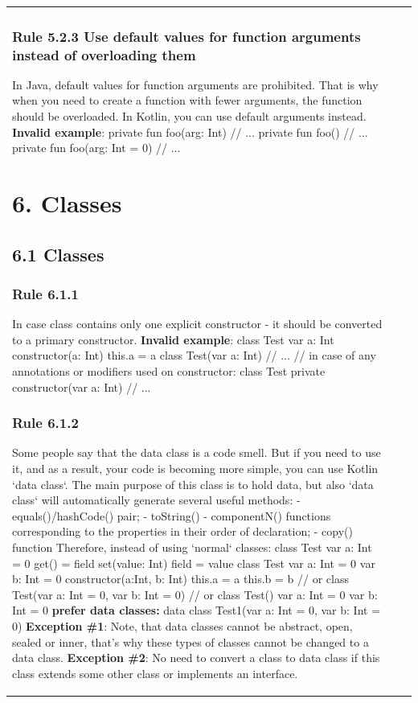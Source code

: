 \begin{center}
\begin{tabular}{ |p{}|p{}|p{}| }
{{{{{\subsubsection*{\textbf{Rule 5.2.3 Use default values for function arguments instead of overloading them}}
In Java, default values for function arguments are prohibited. That is why when you need to create a function with fewer arguments, the function should be overloaded.
In Kotlin, you can use default arguments instead.
\textbf{Invalid example}:
private fun foo(arg: Int) {
    // ...
}
private fun foo() {
    // ...
}
 private fun foo(arg: Int = 0) {
     // ...
 }
\section*{\textbf{6. Classes}}
\subsection*{\textbf{6.1 Classes}}
\subsubsection*{\textbf{Rule 6.1.1}}
In case class contains only one explicit constructor - it should be converted to a primary constructor.
\textbf{Invalid example}:
class Test {
    var a: Int
    constructor(a: Int) {
        this.a = a
    }
}
class Test(var a: Int) {
    // ...
}
// in case of any annotations or modifiers used on constructor:
class Test private constructor(var a: Int) {
    // ...
}
\subsubsection*{\textbf{Rule 6.1.2}}
Some people say that the data class is a code smell. But if you need to use it, and as a result, your code is becoming more simple, you can use Kotlin `data class`. The main purpose of this class is to hold data,
but also `data class` will automatically generate several useful methods:
- equals()/hashCode() pair;
- toString()
- componentN() functions corresponding to the properties in their order of declaration;
- copy() function
Therefore, instead of using `normal` classes:
class Test {
    var a: Int = 0
        get() = field
        set(value: Int) { field = value}
}
class Test {
    var a: Int = 0
    var b: Int = 0
    constructor(a:Int, b: Int) {
        this.a = a
        this.b = b
    }
}
// or
class Test(var a: Int = 0, var b: Int = 0)
// or
class Test() {
    var a: Int = 0
    var b: Int = 0
}
\textbf{prefer data classes:}
data class Test1(var a: Int = 0, var b: Int = 0)
\textbf{Exception \#1}: Note, that data classes cannot be abstract, open, sealed or inner, that's why these types of classes cannot be changed to a data class.
\textbf{Exception \#2}: No need to convert a class to data class if this class extends some other class or implements an interface.
}}}}}
\end{tabular}
\end{center}
